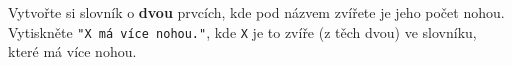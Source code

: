 \question[30]
Vytvořte si slovník o \textbf{dvou} prvcích, kde pod názvem zvířete je jeho
počet nohou.  Vytiskněte \texttt{"X má více nohou."}, kde \texttt{X} je to zvíře
(z těch dvou) ve slovníku, které má více nohou.